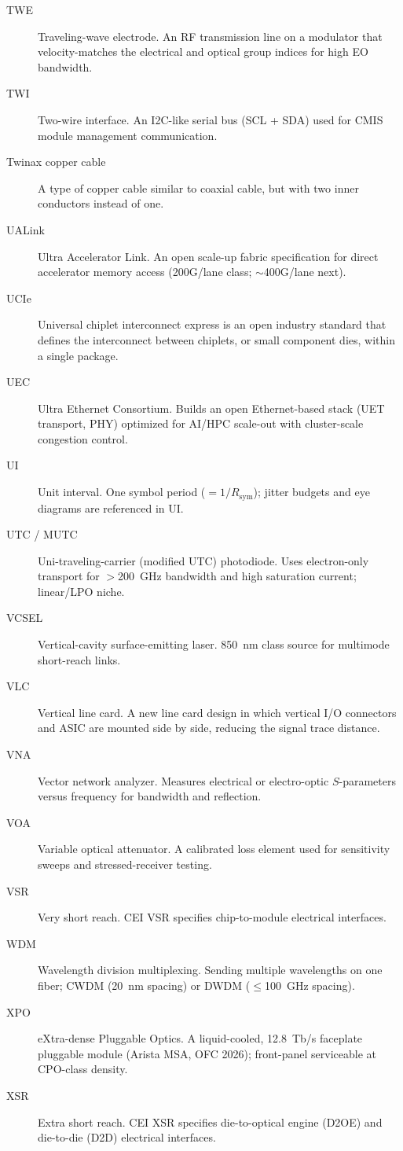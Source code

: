 \begin{description}
\item[TWE] Traveling-wave electrode. An RF transmission line on a modulator that velocity-matches the electrical and optical group indices for high EO bandwidth.
\item[TWI] Two-wire interface. An I2C-like serial bus (SCL + SDA) used for CMIS module management communication.
\item[Twinax copper cable] A type of copper cable similar to coaxial cable, but with two inner conductors instead of one.
\item[UALink] Ultra Accelerator Link. An open scale-up fabric specification for direct accelerator memory access (200G/lane class; $\sim$400G/lane next).
\item[UCIe] Universal chiplet interconnect express is an open industry standard that defines the interconnect between chiplets, or small component dies, within a single package.
\item[UEC] Ultra Ethernet Consortium. Builds an open Ethernet-based stack (UET transport, PHY) optimized for AI/HPC scale-out with cluster-scale congestion control.
\item[UI] Unit interval. One symbol period ($=1/R_\mathrm{sym}$); jitter budgets and eye diagrams are referenced in UI.
\item[UTC / MUTC] Uni-traveling-carrier (modified UTC) photodiode. Uses electron-only transport for $>$200~GHz bandwidth and high saturation current; linear/LPO niche.
\item[VCSEL] Vertical-cavity surface-emitting laser. 850~nm class source for multimode short-reach links.
\item[VLC] Vertical line card. A new line card design in which vertical I/O connectors and ASIC are mounted side by side, reducing the signal trace distance.
\item[VNA] Vector network analyzer. Measures electrical or electro-optic $S$-parameters versus frequency for bandwidth and reflection.
\item[VOA] Variable optical attenuator. A calibrated loss element used for sensitivity sweeps and stressed-receiver testing.
\item[VSR] Very short reach. CEI VSR specifies chip-to-module electrical interfaces.
\item[WDM] Wavelength division multiplexing. Sending multiple wavelengths on one fiber; CWDM (20~nm spacing) or DWDM ($\le$100~GHz spacing).
\item[XPO] eXtra-dense Pluggable Optics. A liquid-cooled, 12.8~Tb/s faceplate pluggable module (Arista MSA, OFC 2026); front-panel serviceable at CPO-class density.
\item[XSR] Extra short reach. CEI XSR specifies die-to-optical engine (D2OE) and die-to-die (D2D) electrical interfaces.
\end{description}

